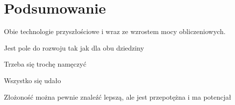 \chapter{Podsumowanie}
Obie technologie przyszłościowe i wraz ze wzrostem mocy obliczeniowych.

Jest pole do rozwoju tak jak dla obu dziedziny 

Trzeba się trochę namęczyć

Wszystko się udało 

Złożoność można pewnie znaleźć lepszą, ale jest przepotężna i ma potencjał
